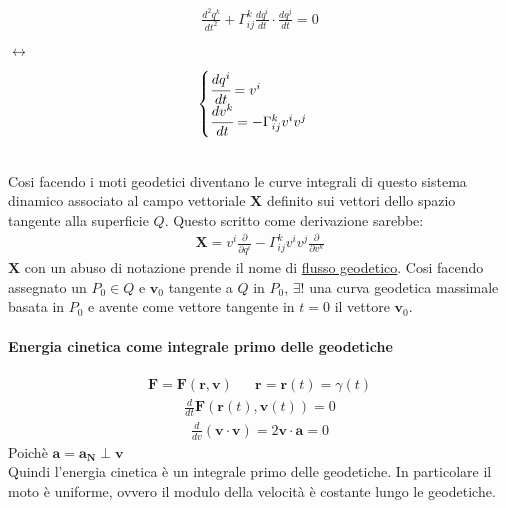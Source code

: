 \begin{minipage}{4cm}
    \begin{align*}
        \frac{d^2q^k}{dt^2}+\Gamma^k_{ij}\frac{dq^i}{dt}\cdot \frac{dq^j}{dt}=0
    \end{align*}
\end{minipage}$\longleftrightarrow$
\begin{minipage}{4cm}
    \begin{align*}
        \begin{cases}
            \cfrac{dq^i}{dt}=v^i\\
            \cfrac{dv^k}{dt}=-\Gamma^k_{ij}v^iv^j
        \end{cases}
    \end{align*}
\end{minipage}
\\
Cosi facendo i moti geodetici diventano le curve integrali di questo sistema dinamico associato al campo vettoriale $\mathbf{X}$ definito sui vettori dello spazio tangente alla superficie $Q$. Questo scritto come derivazione sarebbe:
\begin{align*}
    \mathbf{X}=v^i\frac{\partial}{\partial q^i}-\Gamma^k_{ij}v^iv^j\frac{\partial}{\partial v^k}
\end{align*}
$\mathbf{X}$ con un abuso di notazione prende il nome di \underline{flusso geodetico}.
Cosi facendo assegnato un $P_0\in Q$ e $\mathbf{v}_0$ tangente a $Q$ in $P_0$, $\exists!$ una curva geodetica massimale basata in $P_0$ e avente come vettore tangente in $t=0$ il vettore $\mathbf{v}_0$.
\paragraph*{Energia cinetica come integrale primo delle geodetiche}
\begin{align*}
    \mathbf{F}=\mathbf{F}(\mathbf{r},\mathbf{v}) && \mathbf{r}=\mathbf{r}(t)=\gamma(t)
\end{align*}
\begin{align*}
    \frac{d}{dt}\mathbf{F}(\mathbf{r}(t),\mathbf{v}(t))=0
\end{align*}
\begin{align*}
    \frac{d}{dv}(\mathbf{v}\cdot \mathbf{v})=2\mathbf{v}\cdot\mathbf{a}=0
\end{align*}
Poichè $\mathbf{a}=\mathbf{a}_{\mathbf{N}}\perp \mathbf{v}$\\
Quindi l'energia cinetica è un integrale primo delle geodetiche. In particolare il moto è uniforme, ovvero il modulo della velocità è costante lungo le geodetiche.
